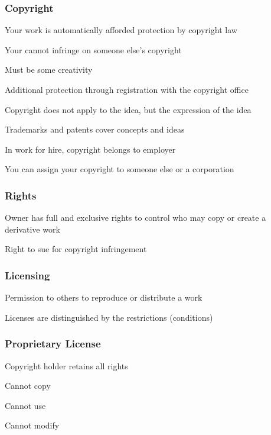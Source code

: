 \documentclass[t,12pt,numbers,fleqn]{beamer}
\begin{document}

\begin{frame}
\frametitle{Copyright}

\bi
\item Your work is automatically afforded protection by copyright law
\bi
\item Your cannot infringe on someone else's copyright
\item Must be some creativity
\ei
\item Additional protection through registration with the copyright office
\item Copyright does not apply to the idea, but the expression of the idea
\item Trademarks and patents cover concepts and ideas
\item In work for hire, copyright belongs to employer
\item You can assign your copyright to someone else or a corporation
\ei

\end{frame}


\begin{frame}
\frametitle{Rights}

\bi
\item Owner has full and exclusive rights to control who may copy or create a
  derivative work
\item Right to sue for copyright infringement
\ei

\end{frame}


\begin{frame}
\frametitle{Licensing}

\bi
\item Permission to others to reproduce or distribute a work
\item Licenses are distinguished by the restrictions (conditions)
\ei

\end{frame}


\begin{frame}
\frametitle{Proprietary License}

\bi
\item Copyright holder retains all rights
\item Cannot copy
\item Cannot use
\item Cannot modify
\ei

\end{frame}
\end{document}
